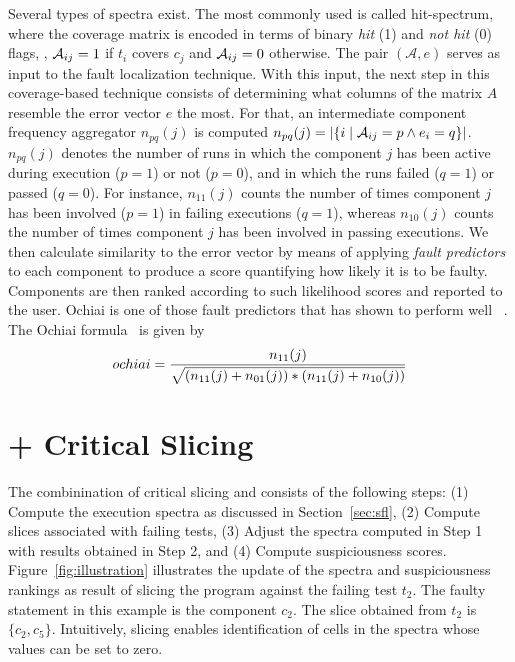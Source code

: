 \documentclass{article}
\begin{document}
Several types of spectra exist.  The most commonly used is called
hit-spectrum, where the coverage matrix is encoded in terms of binary
\emph{hit} (1) and \emph{not hit} (0) flags, \ie{}, $\mathcal{A}_{ij} = 1$ if
$t_i$ covers $c_j$ and $\mathcal{A}_{ij} = 0$ otherwise.  The pair
$(\mathcal{A},e)$ serves as input to the fault localization technique.
With this input, the next step in this coverage-based technique
consists of determining what columns of the matrix $A$ resemble the
error vector $e$ the most.  For that, an intermediate component
frequency aggregator $n_{pq}(j)$ is computed $n_{pq}(j) = |\{i\mid
\mathcal{A}_{ij}=p \wedge e_i=q\}|$. $n_{pq}(j)$ denotes the number of runs in
which the component $j$ has been active during execution ($p = 1$) or
not ($p=0$), and in which the runs failed ($q = 1$) or passed ($q =
0$).  For instance, $n_{11}(j)$ counts the number of times component
$j$ has been involved ($p = 1$) in failing executions ($q = 1$),
whereas $n_{10}(j)$ counts the number of times component $j$ has been
involved in passing executions. We then calculate similarity to the
error vector by means of applying \emph{fault predictors} to each
component to produce a score quantifying how likely it is to be
faulty.  Components are then ranked according to such likelihood
scores and reported to the user. Ochiai is one of those fault
predictors that has shown to perform well ~\cite{Pearson:2017:EIF:3097368.3097441,7390282}.
The Ochiai formula~\cite{DBLP:conf/prdc/AbreuZG06} is given by
\[ochiai = \frac{n_{11}(j)}{\sqrt{(n_{11}(j)+n_{01}(j)) * (n_{11}(j)+n_{10}(j))}}\]


\section{\sfl{} + Critical Slicing}
\label{sec:combination}

The combinination of critical slicing and \sfl{} consists of the
following steps: (1) Compute the execution spectra as discussed in
Section~\ref{sec:sfl}, (2) Compute slices associated with failing
tests, (3) Adjust the spectra computed in Step 1 with results obtained
in Step 2, and (4) Compute suspiciousness
scores. Figure~\ref{fig:illustration} illustrates the update of the
spectra and suspiciousness rankings as result of slicing the program
against the failing test $t_2$. The faulty statement in this example
is the component $c_2$.  The slice obtained from $t_2$ is $\{c_2,
c_5\}$.  Intuitively, slicing enables identification of cells in the
spectra whose values can be set to zero.
\end{document}
